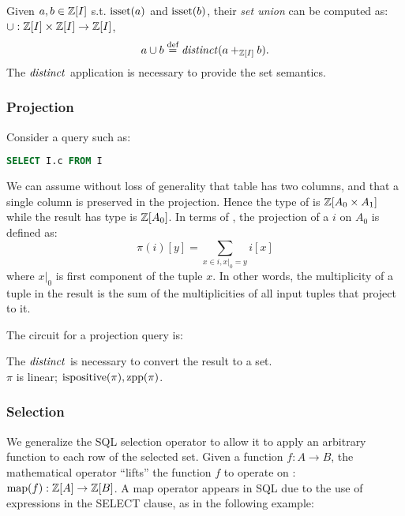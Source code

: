 Given \zrs $a, b \in \mathbb{Z}[I]$ s.t. $\mbox{isset}(a)$ and $\mbox{isset}(b)$, their \emph{set union}
can be computed as: $\cup: \mathbb{Z}[I] \times \mathbb{Z}[I] \rightarrow \mathbb{Z}[I]$,  $$a
\cup b \stackrel{\textrm{\scriptsize def}}{=} \mathit{distinct}(a +_{\mathbb{Z}[I]} b).$$
The $\mathit{distinct}$ application is necessary to provide the set semantics.

\subsubsection{Projection}
Consider a query such as:

\begin{lstlisting}[language=SQL]
SELECT I.c FROM I
\end{lstlisting}

We can assume without loss of generality that table  has two columns, and that
a single column is preserved in the projection.
Hence the type of  is $\mathbb{Z}[A_0 \times A_1]$ while the result has type is $\mathbb{Z}[A_0]$.
In terms of \zrs, the projection of a \zr $i$ on $A_0$ is defined as: $$\pi(i)[y] =
\sum_{x \in i, x|_0 = y} i[x]$$
\noindent where $x|_0$ is first component of the tuple $x$.
In other words, the multiplicity of a tuple in the result is the sum
of the multiplicities of all input tuples that project to it.

The circuit for a projection query is:

\begin{center}
\end{center}

The $\mathit{distinct}$ is necessary to convert the result to a set.\\
$\pi$ is linear; $\mbox{ispositive}(\pi), \mbox{zpp}(\pi)$.

\subsubsection{Selection}

We generalize the SQL selection operator to allow it to apply an arbitrary function to each row of the
selected set.
Given a function $f : A \rightarrow B$, the mathematical  operator ``lifts'' the
function $f$ to operate on \zrs: $\mbox{map}(f) : \mathbb{Z}[A] \rightarrow \mathbb{Z}[B]$.  A map operator
appears in SQL due to the use of expressions in the SELECT clause, as in the following example:

